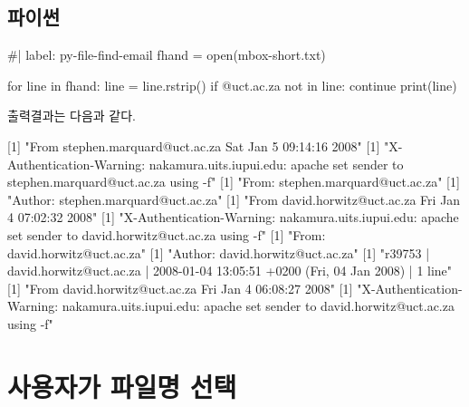\documentclass[
  letterpaper,
]{book}
\newenvironment{Shaded}{\begin{snugshade}}{\end{snugshade}}
\newcommand{\DecValTok}[1]{\textcolor[rgb]{0.68,0.00,0.00}{#1}}
\newcommand{\NormalTok}[1]{\textcolor[rgb]{0.00,0.23,0.31}{#1}}
\newcommand{\StringTok}[1]{\textcolor[rgb]{0.13,0.47,0.30}{#1}}
\begin{document}
\subsection{파이썬}

\begin{Shaded}
\begin{Highlighting}[]
\NormalTok{\#| label: py{-}file{-}find{-}email}
\NormalTok{fhand = open(\textquotesingle{}mbox{-}short.txt\textquotesingle{})}

\NormalTok{for line in fhand:}
\NormalTok{    line = line.rstrip()}
\NormalTok{    if \textquotesingle{}@uct.ac.za\textquotesingle{} not in line:}
\NormalTok{        continue}
\NormalTok{    print(line)}
\end{Highlighting}
\end{Shaded}

출력결과는 다음과 같다.

\begin{Shaded}
\begin{Highlighting}[]
\NormalTok{[}\DecValTok{1}\NormalTok{] }\StringTok{"From stephen.marquard@uct.ac.za Sat Jan  5 09:14:16 2008"}
\NormalTok{[}\DecValTok{1}\NormalTok{] }\StringTok{"X{-}Authentication{-}Warning: nakamura.uits.iupui.edu: apache set sender to stephen.marquard@uct.ac.za using {-}f"}
\NormalTok{[}\DecValTok{1}\NormalTok{] }\StringTok{"From: stephen.marquard@uct.ac.za"}
\NormalTok{[}\DecValTok{1}\NormalTok{] }\StringTok{"Author: stephen.marquard@uct.ac.za"}
\NormalTok{[}\DecValTok{1}\NormalTok{] }\StringTok{"From david.horwitz@uct.ac.za Fri Jan  4 07:02:32 2008"}
\NormalTok{[}\DecValTok{1}\NormalTok{] }\StringTok{"X{-}Authentication{-}Warning: nakamura.uits.iupui.edu: apache set sender to david.horwitz@uct.ac.za using {-}f"}
\NormalTok{[}\DecValTok{1}\NormalTok{] }\StringTok{"From: david.horwitz@uct.ac.za"}
\NormalTok{[}\DecValTok{1}\NormalTok{] }\StringTok{"Author: david.horwitz@uct.ac.za"}
\NormalTok{[}\DecValTok{1}\NormalTok{] }\StringTok{"r39753 | david.horwitz@uct.ac.za | 2008{-}01{-}04 13:05:51 +0200 (Fri, 04 Jan 2008) | 1 line"}
\NormalTok{[}\DecValTok{1}\NormalTok{] }\StringTok{"From david.horwitz@uct.ac.za Fri Jan  4 06:08:27 2008"}
\NormalTok{[}\DecValTok{1}\NormalTok{] }\StringTok{"X{-}Authentication{-}Warning: nakamura.uits.iupui.edu: apache set sender to david.horwitz@uct.ac.za using {-}f"}
\end{Highlighting}
\end{Shaded}

\section{사용자가 파일명 선택}\label{r-file-user-input}
\end{document}
